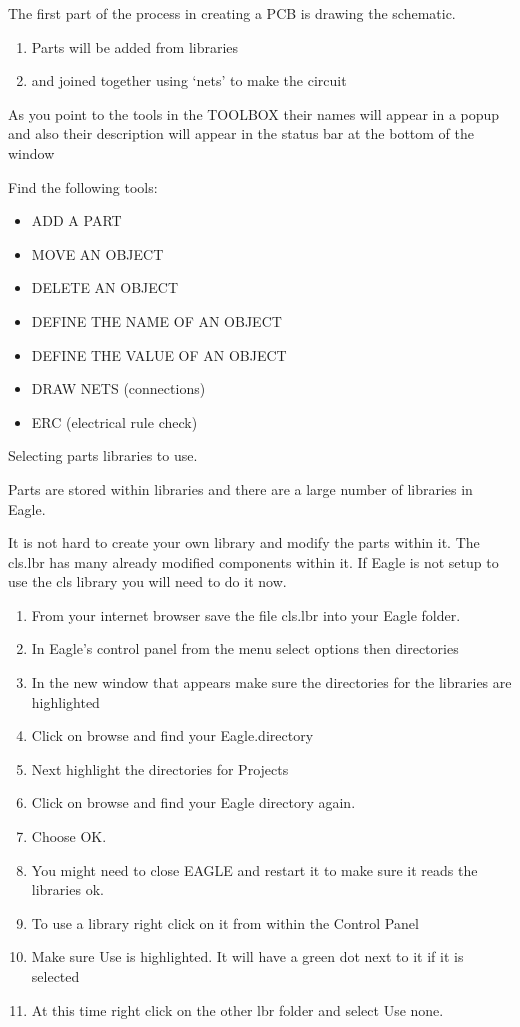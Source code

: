 
\secdown

The first part of the process in creating a PCB is drawing the schematic.

\begin{enumerate}
  \item 
Parts will be added from libraries
  \item 
and joined together using ‘nets’ to make the circuit
\end{enumerate}


As you point to the tools in the TOOLBOX their names will appear in a popup and
also their description will appear in the status bar at the bottom of the window

Find the following tools:

\begin{itemize}
  \item 
ADD A PART
  \item 
MOVE AN OBJECT
  \item 
DELETE AN OBJECT
  \item 
DEFINE THE NAME OF AN OBJECT
  \item 
DEFINE THE VALUE OF AN OBJECT
  \item 
DRAW NETS (connections)
  \item 
ERC (electrical rule check)
\end{itemize}
 

Selecting parts libraries to use.

Parts are stored within libraries and there are a large number of libraries in
Eagle.

It is not hard to create your own library and modify the parts within it. The
cls.lbr has many already modified components within it. If Eagle is not setup to
use the cls library you will need to do it now.

\begin{enumerate}
\item From your internet browser save the file cls.lbr into your Eagle folder.
\item In Eagle's control panel from the menu select options then directories
\item In the new window that appears make sure the directories for the libraries
 are highlighted
\item Click on browse and find your Eagle.directory
\item Next highlight the directories for Projects
\item Click on browse and find your Eagle directory again.
\item Choose OK.
\item You might need to close EAGLE and restart it to make sure it reads the
 libraries ok.
\item To use a library right click on it from within the Control Panel
\item Make sure Use is highlighted. It will have a green dot next to it if it is
 selected
\item At this time right click on the other lbr folder and select Use none.
\end{enumerate}

